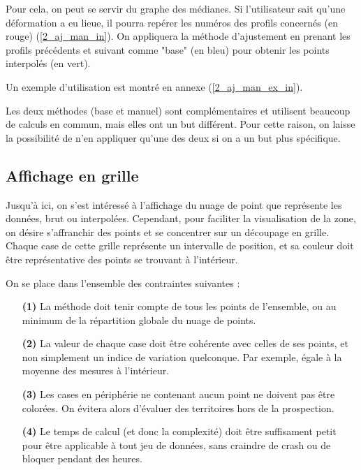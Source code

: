 \documentclass[12pt]{article}
\begin{document}
    \label{2_aj_man_out} Pour cela, on peut se servir du graphe des médianes. Si l'utilisateur sait qu'une déformation a eu lieue, il pourra repérer les numéros des profils concernés (en rouge) (\ref{2_aj_man_in}). On appliquera la méthode d'ajustement en prenant les profils précédents et suivant comme "base" (en bleu) pour obtenir les points interpolés (en vert).

    \label{2_aj_man_ex_out} Un exemple d'utilisation est montré en annexe (\ref{2_aj_man_ex_in}).

    Les deux méthodes (base et manuel) sont complémentaires et utilisent beaucoup de calculs en commun, mais elles ont un but différent. Pour cette raison, on laisse la possibilité de n'en appliquer qu'une des deux si on a un but plus spécifique.

\newpage
\subsection{Affichage en grille}\label{2-3}

    Jusqu'à ici, on s'est intéressé à l'affichage du nuage de point que représente les données, brut ou interpolées. Cependant, pour faciliter la visualisation de la zone, on désire s'affranchir des points et se concentrer sur un découpage en grille. Chaque case de cette grille représente un intervalle de position, et sa couleur doit être représentative des points se trouvant à l'intérieur.

    On se place dans l'ensemble des contraintes suivantes :
    \begin{enumerate}
        \item[\textbf{(1)}] La méthode doit tenir compte de tous les points de l'ensemble, ou au minimum de la répartition globale du nuage de points.
        \item[\textbf{(2)}] La valeur de chaque case doit être cohérente avec celles de ses points, et non simplement un indice de variation quelconque. Par exemple, égale à la moyenne des mesures à l'intérieur.
        \item[\textbf{(3)}] Les cases en périphérie ne contenant aucun point ne doivent pas être colorées. On évitera alors d'évaluer des territoires hors de la prospection.
        \item[\textbf{(4)}] Le temps de calcul (et donc la complexité) doit être suffisament petit pour être applicable à tout jeu de données, sans craindre de crash ou de bloquer pendant des heures.
    \end{enumerate}
\end{document}
